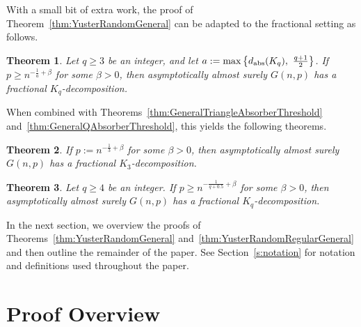 \documentclass[11pt]{article}
\numberwithin{equation}{section}
\newcounter{i}
\theoremstyle{plain}
\newtheorem{thm}{Theorem}[section]
\theoremstyle{plain} %
\theoremstyle{definition}
\begin{document}
With a small bit of extra work, the proof of Theorem~\ref{thm:YusterRandomGeneral} can be adapted to the fractional setting as follows.

\begin{thm}\label{thm:YusterRandomFractionalGeneral}
Let $q \ge 3$ be an integer, and let $a:= \max\left\{ d_{{\rm abs}}(K_q),~ \frac{q+1}{2}\right\}$. If $p\ge n^{-\frac{1}{a}+\beta}$ for some $\beta > 0$, then asymptotically almost surely $G(n,p)$ has a fractional $K_q$-decomposition.
\end{thm}

When combined with Theorems~\ref{thm:GeneralTriangleAbsorberThreshold} and~\ref{thm:GeneralQAbsorberThreshold}, this yields the following theorems.

\begin{thm}\label{thm:YusterTriangleFractional}
If $p:=n^{-\frac{1}{3}+\beta}$ for some $\beta > 0$, then asymptotically almost surely $G(n,p)$ has a fractional $K_3$-decomposition.
\end{thm}

\begin{thm}\label{thm:YusterFractional}
Let $q \ge 4$ be an integer. If $p\ge n^{-\frac{1}{q+0.5}+\beta}$ for some $\beta > 0$, then asymptotically almost surely $G(n,p)$ has a fractional $K_q$-decomposition. 
\end{thm}

In the next section, we overview the proofs of Theorems~\ref{thm:YusterRandomGeneral} and~\ref{thm:YusterRandomRegularGeneral} and then outline the remainder of the paper.  See Section~\ref{s:notation} for notation and definitions used throughout the paper.

\section{Proof Overview}\label{s:Overview}
\end{document}
